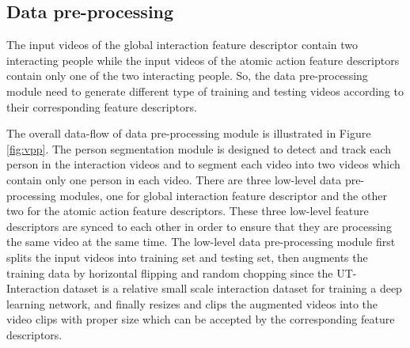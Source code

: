 \subsection{Data pre-processing}
The input videos of the global interaction feature descriptor contain two interacting people while the input videos of the atomic action feature descriptors contain only one of the two interacting people. So, the data pre-processing module need to generate different type of training and testing videos according to their corresponding feature descriptors. 
\par
The overall data-flow of data pre-processing module is illustrated in Figure \ref{fig:vpp}. The person segmentation module is designed to detect and track each person in the interaction videos and to segment each video into two videos which contain only one person in each video. There are three low-level data pre-processing modules, one for global interaction feature descriptor and the other two for the atomic action feature descriptors. These three low-level feature descriptors are synced to each other in order to ensure that they are processing the same video at the same time. The low-level data pre-processing module first splits the input videos into training set and testing set, then augments the training data by horizontal flipping and random chopping since the UT-Interaction dataset is a relative small scale interaction dataset for training a deep learning network, and finally resizes and clips the augmented videos into the video clips with proper size which can be accepted by the corresponding feature descriptors.  
